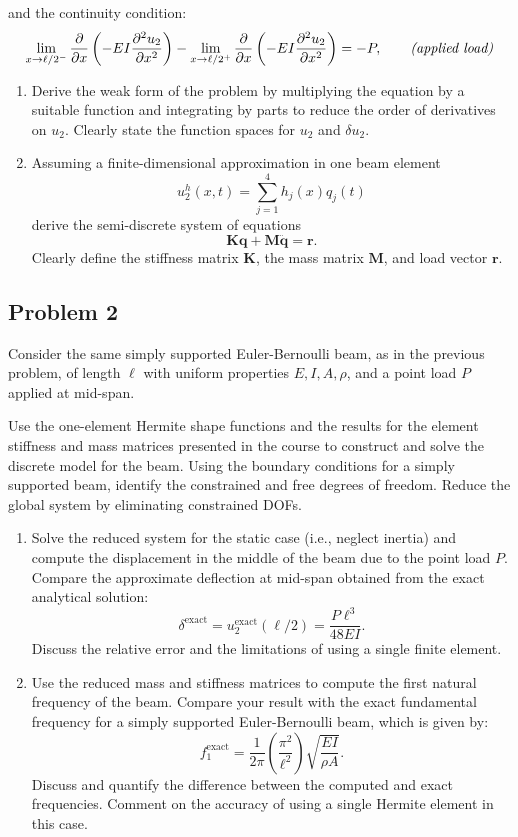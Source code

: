 \documentclass[12pt]{article}
\begin{document}
and the continuity condition:
\[
    \lim_{x\to\ell/2^-} \frac{\partial}{\partial x}\left(-EI\frac{\partial^2u_2}{\partial x^2}\right)-\lim_{x\to\ell/2^+} \frac{\partial}{\partial x}\left(-EI\frac{\partial^2u_2}{\partial x^2}\right)=-P, \qquad \text{\emph{(applied load)}}
\]
\begin{enumerate}
    \item Derive the weak form of the problem by multiplying the equation by a suitable function and integrating by parts to reduce the order of derivatives on $u_2$. Clearly state the function spaces for \( u_2 \) and \( \delta u_2\).
    \item Assuming a finite-dimensional approximation in one beam element
          $$u^h_2(x,t) = \sum_{j=1}^4 h_j(x) q_j(t)$$
          derive the semi-discrete system of equations
          $$\mathbf{K} \mathbf q+\mathbf{M}\ddot{\mathbf q} = \mathbf{r}.$$
          Clearly define the stiffness matrix \( \mathbf{K} \), the mass matrix \( \mathbf{M} \),  and load vector \( \mathbf{r} \).
\end{enumerate}



\subsection*{Problem 2}
Consider the same simply supported Euler-Bernoulli beam, as in the previous problem, of length \( \ell \) with uniform properties \( E, I, A, \rho \), and a point load \( P \) applied at mid-span.

Use the one-element Hermite shape functions and the results for the element stiffness and mass matrices presented in the course to construct and solve the discrete model for the beam. Using the boundary conditions for a simply supported beam, identify the constrained and free degrees of freedom. Reduce the global system by eliminating constrained DOFs.

\begin{enumerate}
    \item Solve the reduced system for the static case (i.e., neglect inertia) and compute the displacement in the middle of the beam due to the point load \( P \). Compare the approximate deflection at mid-span obtained from the exact analytical solution:
          \[
              \delta^\text{exact}=u_2^\text{exact}(\ell/2) = \frac{P \ell^3}{48 EI}.
          \]
          Discuss the relative error and the limitations of using a single finite element.

    \item Use the reduced mass and stiffness matrices to compute the first natural frequency of the beam. Compare your result with the exact fundamental frequency for a simply supported Euler-Bernoulli beam, which is given by:
          \[
              f_1^\text{exact} = \frac{1}{2\pi} \left(\frac{\pi^2}{\ell^2}\right) \sqrt{\frac{EI}{\rho A}}.
          \]
          Discuss and quantify the difference between the computed and exact frequencies. Comment on the accuracy of using a single Hermite element in this case.
\end{enumerate}
\end{document}
